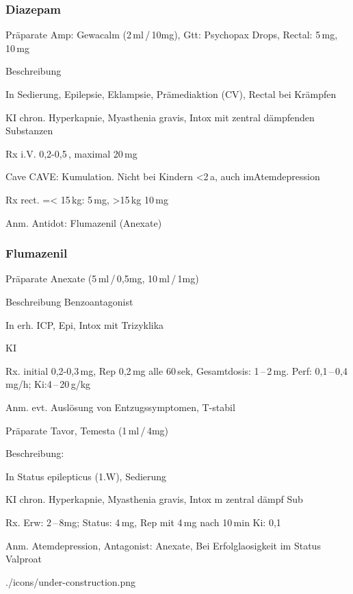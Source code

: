 \subsubsection{Diazepam}
\begin{labeling}[:]{mm}
  \item[Präparate] Amp: Gewacalm (2\,ml\,/\,10mg), Gtt: Psychopax Drops,
  Rectal: 5\,mg, 10\,mg
  \item[Beschreibung] 
  \item[In] Sedierung, Epilepsie, Eklampsie, Prämediaktion (CV), Rectal bei
  Krämpfen
  \item[KI] chron. Hyperkapnie, Myasthenia gravis, Intox mit
zentral dämpfenden Substanzen
\item[Rx i.V.]  0,2-0,5\,, maximal 20\,mg
\item[Cave] CAVE: Kumulation. Nicht bei Kindern {\textless}2\,a, auch
imAtemdepression
\item[Rx rect.] ={\textless} 15\,kg: 5\,mg, {\textgreater}15\,kg 10\,mg
\item[Anm.] Antidot: Flumazenil (Anexate)

\end{labeling}



\subsubsection{Flumazenil}

\begin{labeling}[:]{mm}
  \item[Präparate] Anexate (5\,ml\,/\,0,5mg, 10\,ml\,/\,1mg)
  \item[Beschreibung] Benzoantagonist
  \item[In] erh. ICP, Epi, Intox mit Trizyklika
  \item[KI] 
  \item[Rx.] initial 0,2-0,3\,mg, Rep 0,2\,mg alle 60\,sek,
Gesamtdosis: 1\,--\,2\,mg. Perf: 0,1\,--\,0,4\,mg/h; Ki:4\,--\,20\,{\textmu}g/kg
\item[Anm.] evt. Auslösung von Entzugssymptomen, T{\textdegree}-stabil
\end{labeling}




{
\begin{labeling}[:]{mm}
  \item[Präparate] Tavor, Temesta (1\,ml\,/\,4mg)
  \item[Beschreibung:]
  \item[In] Status epilepticus (1.W), Sedierung
  \item[KI] chron. Hyperkapnie, Myasthenia gravis, Intox m
  zentral dämpf Sub
  \item[Rx.] Erw: 2\,--\,8mg; Status: 4\,mg, Rep mit 4\,mg nach 10\,min\newline
  Ki: 0,1\,
  \item[Anm.] Atemdepression, Antagonist: Anexate, Bei Erfolglaosigkeit im Status
  Valproat
\end{labeling}
}
{}
{./icons/under-construction.png}
{}
{}






